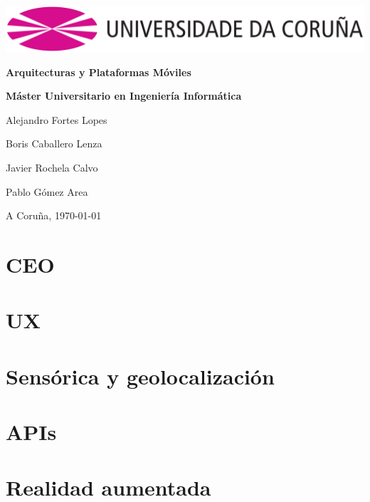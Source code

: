 \documentclass[12pt, a4paper, titlepage]{article}
\begin{document}
	\begin{titlepage}
	\includegraphics[width=15cm]{img/Simbolo_logo_UDC.png}
	\vspace{6cm}
		\begin{center}
			\Huge{\textbf{Arquitecturas y Plataformas Móviles}}
			
			\large{\textbf{Máster Universitario en Ingeniería Informática}}
			
		\end{center}
		\vspace{10cm}
		\begin{flushright}
			
			Alejandro Fortes Lopes
			
			Boris Caballero Lenza
			
			Javier Rochela Calvo
			
			Pablo Gómez Area
			
		\end{flushright}
		
		\vspace{1cm}
		\begin{flushright}
			A Coruña, \today
		\end{flushright}	


	\end{titlepage}
	
	\clearpage
	
	\tableofcontents
	
	\clearpage
	
	\section{CEO}
	
	\clearpage
	
	\section{UX}
	
	\clearpage
	
	\section{Sensórica y geolocalización}
	
	\clearpage
	
	\section{APIs}
	
	\clearpage
	
	\section{Realidad aumentada}
	
	
		
\end{document}
